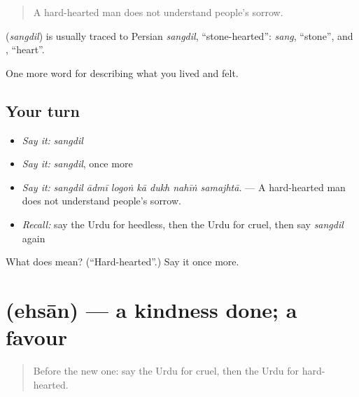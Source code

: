 \begin{quote}
A hard-hearted man does not understand people's sorrow.
\end{quote}

\begin{cousinweb}
\textbf{} (\emph{sangdil}) is usually traced to Persian \emph{sangdil}, \textquotedblleft{}stone-hearted\textquotedblright{}: \emph{sang}, \textquotedblleft{}stone\textquotedblright{}, and \textbf{}, \textquotedblleft{}heart\textquotedblright{}.
\end{cousinweb}

\begin{grammarlens}[title={What you've built}]
One more word for describing what you lived and felt.
\end{grammarlens}

\subsection*{Your turn}
\begin{itemize}
\raggedright
  \item \emph{Say it:} \emph{sangdil}
  \item \emph{Say it:} \emph{sangdil}, once more
  \item \emph{Say it:} \emph{sangdil ādmī logoṅ kā dukh nahīṅ samajhtā.} — A hard-hearted man does not understand people's sorrow.
  \item \emph{Recall:} say the Urdu for heedless, then the Urdu for cruel, then say \emph{sangdil} again
\end{itemize}

\begin{tcolorbox}[breakable,colback=teal!4,colframe=teal!35!black,title={Before you move on}]
What does  mean? (\textquotedblleft{}Hard-hearted\textquotedblright{}.) Say it once more.
\end{tcolorbox}
\section[\texorpdfstring{\ur{احسان} (ehsān)}{احسان (ehsān)}]{ (ehsān) — a kindness done; a favour}

\label{lesson:UR-C456-ehsan}



\begin{quote}
Before the new one: say the Urdu for cruel, then the Urdu for hard-hearted.
\end{quote}

